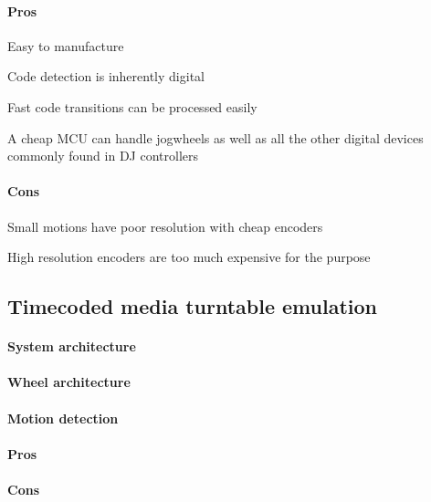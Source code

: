 \documentclass[a4paper,10pt]{article}
\begin{document}
\begin{multicols}{2}
\paragraph{Pros}
\begin{itemize*}
	\item Easy to manufacture
	\item Code detection is inherently digital
	\item Fast code transitions can be processed easily
	\item A cheap MCU can handle jogwheels as well as all the other digital devices
		commonly found in DJ controllers
\end{itemize*}


\paragraph{Cons}
\begin{itemize*}
	\item Small motions have poor resolution with cheap encoders
	\item High resolution encoders are too much expensive for the purpose
\end{itemize*}


\subsection{Timecoded media turntable emulation}

\TODO 


\paragraph{System architecture}
\TODO


\paragraph{Wheel architecture}
\TODO


\paragraph{Motion detection}
\TODO


\paragraph{Pros}
\TODO


\paragraph{Cons}
\TODO



\end{multicols}
\end{document}
